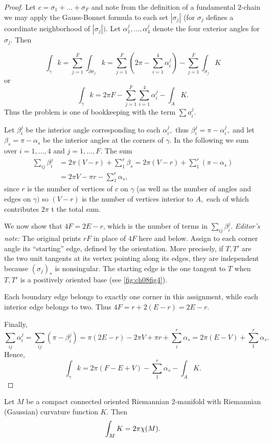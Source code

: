 \documentclass[../main]{subfiles}
\begin{document}
\begin{proof}
Let $c=\sigma_1+\ldots+\sigma_F$ and note from the definition of a fundamental $2$-chain we may apply the Gauss-Bonnet formula to each set $|\sigma_j|$ (for $\sigma_j$ defines a coordinate neighborhood of $|\sigma_j|).$ Let $\alpha_1^j,\ldots,\alpha_4^j$ denote the four exterior angles for $\sigma_j.$ Then

\[\int_{\gamma}k=\sum_{j=1}^F \int_{\partial \sigma_j}k=\sum_{j=1}^F (2\pi-\sum_{i=1}^4 \alpha_i^j)-\sum_{j=1}^F\int_{\sigma_j}K\] or \[\int_{\gamma}k=2\pi F-\sum_{j=1}^F \sum_{i=1}^4 \alpha_i^j - \int_{A}K.\] Thus the problem is one of bookkeeping with the term $\sum a_i^j.$ 

Let $\beta_i^j$ be the interior angle corresponding to each $\alpha_i^j,$ thus $\beta_i^j=\pi-\alpha_i^j,$ and let $\beta_s=\pi-\alpha_s$ be the interior angles at the corners of $\gamma.$ In the following we sum over $i=1,\ldots,4$ and $j=1,\ldots,F.$ The sum \begin{align*}
\sum_{ij}\beta_i^j&=2\pi(V-r)+\sum_1^r \beta_s=2\pi(V-r)+\sum_1^r(\pi-\alpha_s)\\
&= 2\pi V-\pi r-\sum_{1}^r\alpha_s,
\end{align*} since $r$ is the number of vertices of $c$ on $\gamma$ (as well as the number of angles and edges on $\gamma)$ so $(V-r)$ is the number of vertices interior to $A,$ each of which contributes $2\pi$ t the total sum.

We now show that $4F=2E-r$, which is the number of terms in $\sum_{ij}\beta_i^j$. \emph{Editor's note:} The original prints $rF$ in place of $4F$ here and below. Assign to each corner angle its ``starting'' edge, defined by the orientation. More precisely, if $T,T'$ are the two unit tangents at its vertex pointing along its edges, they are independent because $(\sigma_j)_\ast$ is nonsingular. The starting edge is the one tangent to $T$ when $T,T'$ is a positively oriented base (see \ref{fig:ch08fig4}).

Each boundary edge belongs to exactly one corner in this assignment, while each interior edge belongs to two. Thus $4F=r+2(E-r)=2E-r$.

Finally, \[\sum_{ij}\alpha_i^j=\sum_{ij}(\pi-\beta_i^j)=\pi(2E-r)-2\pi V+\pi r+\sum_{i}^r\alpha_s=2\pi(E-V)+\sum_{1}^r \alpha_s.\] Hence, \[\int_{\gamma}k=2\pi(F-E+V)-\sum_1^r\alpha_s-\int_{A}K.\]
\end{proof}



\begin{theorem} \label{thm:ch8.1.5}
Let $M$ be a compact connected oriented Riemannian $2$-manifold with Riemannian (Gaussian) curvature function $K.$ Then \[\int_{M}K=2\pi\chi(M).\]
\end{theorem}
\end{document}
